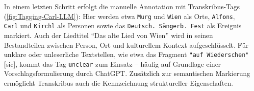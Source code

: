 \documentclass[12pt, a4paper, ngerman, bidi=default]{article}
\begin{document}
\begin{minipage}[t]{0.52\textwidth}
  \justifying
  \noindent
In einem letzten Schritt erfolgt die manuelle Annotation mit Transkribus-Tags (\ref{fig:Tagging-Carl-LLM}): 
Hier werden etwa \texttt{Murg} und \texttt{Wien} als Orte, \texttt{Alfons}, \texttt{Carl} und \texttt{Kirchl} als Personen sowie das 
\texttt{Deutsch. Sängerb. Fest} als Ereignis markiert. Auch der Liedtitel \enquote{Das alte Lied von Wien} wird in seinen Bestandteilen 
zwischen Person, Ort und kulturellem Kontext aufgeschlüsselt. Für unklare oder unleserliche Textstellen, wie etwa das Fragment \texttt{"auf Wiederschen"}[sic], 
kommt das Tag \texttt{unclear} zum Einsatz – häufig auf Grundlage einer Vorschlagsformulierung durch ChatGPT. Zusätzlich zur semantischen Markierung ermöglicht Transkribus auch die Kennzeichnung struktureller Eigenschaften.
\end{minipage}
\end{document}
